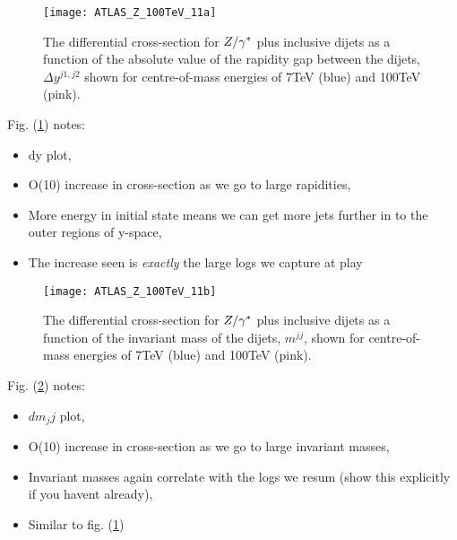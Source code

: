 	\begin{figure}[h]
		\centering
		\texttt{[image: ATLAS\_Z\_100TeV\_11a]}
		\caption{The differential cross-section for $Z/\gamma^*$ plus inclusive dijets as a function of the absolute value of the
		         rapidity gap between the dijets, $\Delta y^{j1, j2}$ shown for centre-of-mass energies of 7TeV (blue) and
		         100TeV (pink).}
		\label{fig:100tev_11a}
	\end{figure}

	Fig. (\ref{fig:100tev_11a}) notes:

	\begin{itemize}
		\item dy plot,
		\item O(10) increase in cross-section as we go to large rapidities,
		\item More energy in initial state means we can get more jets further in to the outer regions of y-space,
		\item The increase seen is \emph{exactly} the large logs we capture at play
	\end{itemize}

	\begin{figure}[h]
		\centering
		\texttt{[image: ATLAS\_Z\_100TeV\_11b]}
		\caption{The differential cross-section for $Z/\gamma^*$ plus inclusive dijets as a function of the invariant mass
		         of the dijets, $m^{jj}$, shown for centre-of-mass energies of 7TeV (blue) and 100TeV (pink).}
		\label{fig:100tev_11b}
	\end{figure}

	Fig. (\ref{fig:100tev_11b}) notes:

	\begin{itemize}
		\item $dm_jj$ plot,
		\item O(10) increase in cross-section as we go to large invariant masses,
		\item Invariant masses again correlate with the logs we resum (show this explicitly if you havent already),
		\item Similar to fig. (\ref{fig:100tev_11a})
	\end{itemize}

